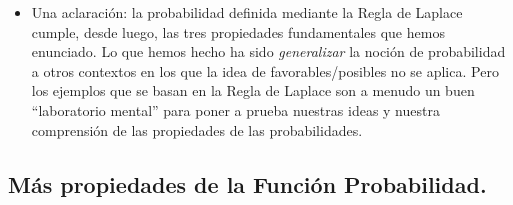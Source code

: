 \begin{itemize}
    \item Una aclaración: la probabilidad definida mediante la Regla de Laplace cumple, desde luego, las tres propiedades fundamentales que hemos enunciado. Lo que hemos hecho ha sido {\em generalizar} la noción de probabilidad a otros contextos en los que la idea de favorables/posibles no se aplica. Pero los ejemplos que se basan en la Regla de Laplace son a menudo un buen ``laboratorio mental'' para poner a prueba nuestras ideas y nuestra comprensión de las propiedades de las probabilidades.

\end{itemize}

\subsection{Más propiedades de la Función Probabilidad.}

